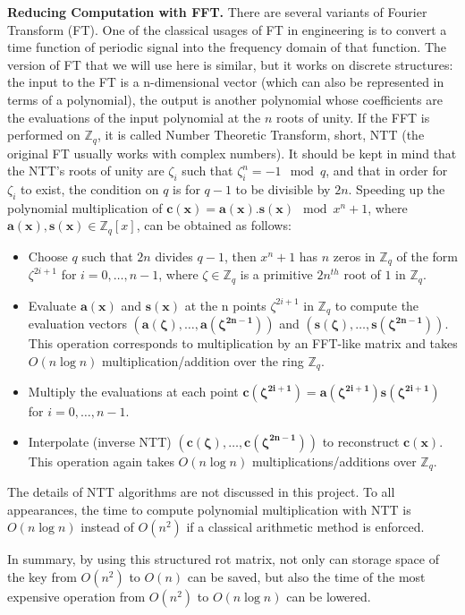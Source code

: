 \begin{description}
  \textbf{Reducing Computation with FFT.} There are several variants of Fourier
  Transform (FT). One of the classical usages of FT in engineering is to convert
  a time function of periodic signal into the frequency domain of that
  function. The version of FT that we will use here is similar, but it works on
  discrete structures: the input to the FT is a n-dimensional vector (which can
  also be represented in terms of a polynomial), the output is another
  polynomial whose coefficients are the evaluations of the input polynomial at
  the $n$ roots of unity.  If the FFT is performed on $\mathbb{Z}_q$, it is called
  Number Theoretic Transform, short, NTT (the original FT usually works with complex
  numbers). It should be kept in mind that the NTT's roots of unity are $\zeta_i$ such that
  $\zeta_i^n = -1\mod q$, and that in order for $\zeta_i$ to exist, the condition on
  $q$ is for $q -1$ to be divisible by $2n$.  Speeding up the polynomial multiplication of
  $\mathbf{c(x) = a(x).s(x)} \mod x^n +1$, where $\mathbf{a(x),s(x)} \in \mathbb{Z}_q[x]$, can be obtained as follows:
  \begin{itemize}
  \item Choose $q$ such that $2n$ divides $q-1$, then $x^n + 1$ has $n$ zeros in
    $\mathbb{Z}_q$ of the form $\zeta^{2i + 1}$ for $i = 0,\dots,n-1$, where
    $\zeta \in \mathbb{Z}_q$ is a primitive $2n^{th}$ root of $1$ in
    $\mathbb{Z}_q$.
  \item Evaluate $\mathbf{a(x)}$ and $\mathbf{s(x)}$ at the n points
    $\zeta^{2i + 1}$ in $\mathbb{Z}_q$ to compute the evaluation vectors
    $\mathbf{(a(\zeta),\dots,a(\zeta^{2n-1}))}$ and
    $\mathbf{(s(\zeta), \dots, s(\zeta^{2n - 1}))}$. This operation corresponds
    to multiplication by an FFT-like matrix and takes $O(n \log n)$
    multiplication/addition over the ring $\mathbb{Z}_q$.
  \item Multiply the evaluations at each point
    $\mathbf{c(\zeta^{2i + 1}) = a(\zeta^{2i+1})s(\zeta^{2i+1})}$ for
    $i = 0,\dots,n-1$.
  \item Interpolate (inverse NTT) $\mathbf{(c(\zeta), \dots, c(\zeta^{2n-1}))}$
    to reconstruct $\mathbf{c(x)}$. This operation again takes $O(n\log n)$
    multiplications/additions over $\mathbb{Z}_q$.
  \end{itemize}
  The details of NTT algorithms are not discussed in this project. To all appearances,
  the time to compute polynomial multiplication with NTT is $O(n \log n)$
  instead of $O(n^2)$ if a classical arithmetic method is enforced.

  In summary, by using this structured rot matrix, not only can storage space of the key from $O(n^2)$ to $O(n)$ can be saved, but also the time of the most expensive
  operation from $O(n^2)$ to $O(n\log n)$ can be lowered.
\end{description}

